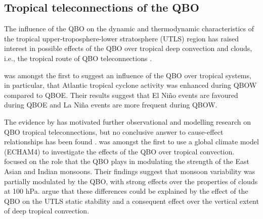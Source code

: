 




\subsection{Tropical teleconnections of the QBO}\label{sq:trop_qbo}

 The influence of the QBO on the dynamic and thermodynamic characteristics of the tropical upper-troposphere-lower stratosphere  (UTLS) region has raised interest in possible effects of the QBO over tropical deep convection and clouds, i.e., the tropical route of QBO teleconnections \citep{gray2018}.


\cite{gray1984} was amongst the first to suggest an influence of the QBO over tropical systems, in particular, that Atlantic tropical cyclone activity was enhanced during QBOW compared to QBOE. 
 Their results suggest that El Niño events are favoured during QBOE and  La Niña events are more frequent during QBOW.

The evidence by \cite{gray1992} has motivated further observational and modelling research on QBO tropical teleconnections, but no conclusive answer to cause-effect relationships has been found \citep[e.g.][]{chan1995,camargo2010,hansen2016tropospheric}. 
\cite{giorgetta1999} was amongst the first to use a global climate model (ECHAM4) to investigate the effects of the QBO over tropical convection. \cite{giorgetta1999} focused on the role that the QBO plays in modulating the strength of the East Asian and Indian monsoons. Their findings suggest that monsoon variability was partially modulated by the QBO, with strong effects over the properties of clouds at 100 hPa. \cite{giorgetta1999} argue that these differences could be explained by the effect of the QBO on the UTLS static stability and a consequent effect over the vertical extent of deep tropical convection. 

